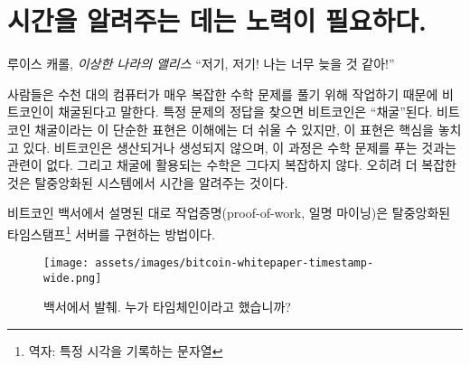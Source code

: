\chapter{시간을 알려주는 데는 노력이 필요하다.}
\label{les:17}

\begin{chapquote}{루이스 캐롤, \textit{이상한 나라의 앨리스}}
	\enquote{저기, 저기! 나는 너무 늦을 것 같아!}
\end{chapquote}

\begin{comment}
	It is often said that bitcoins are mined because thousands of computers
	work on solving \textit{very complex} mathematical problems. Certain problems
	are to be solved, and if you compute the right answer, you \enquote{produce} a
	bitcoin. While this simplified view of bitcoin mining might be easier to
	convey, it does miss the point somewhat. Bitcoins aren't produced or
	created, and the whole ordeal is not really about solving particular
	math problems. Also, the math isn't particularly complex. What is
	complex is \textit{telling the time} in a decentralized system.
\end{comment}
사람들은 수천 대의 컴퓨터가 매우 복잡한 수학 문제를 풀기 위해 작업하기 때문에 비트코인이 채굴된다고 말한다.
특정 문제의 정답을 찾으면 비트코인은 \enquote{채굴}된다.
비트코인 채굴이라는 이 단순한 표현은 이해에는 더 쉬울 수 있지만, 이 표현은 핵심을 놓치고 있다.
비트코인은 생산되거나 생성되지 않으며, 이 과정은 수학 문제를 푸는 것과는 관련이 없다.
그리고 채굴에 활용되는 수학은 그다지 복잡하지 않다. 
오히려 더 복잡한 것은 탈중앙화된 시스템에서 시간을 알려주는 것이다.

\begin{comment}
	As outlined in the whitepaper, the proof-of-work system (aka mining) is
	a way to implement a distributed timestamp server.
\end{comment}
비트코인 백서에서 설명된 대로 작업증명(proof-of-work, 일명 마이닝)은 탈중앙화된 타임스탬프\footnote{역자: 특정 시각을 기록하는 문자열} 서버를 구현하는 방법이다.

\begin{figure}
	\texttt{[image: assets/images/bitcoin-whitepaper-timestamp-wide.png]}
	\caption{백서에서 발췌. 누가 타임체인이라고 했습니까?}
	\label{fig:bitcoin-whitepaper-timestamp-wide}
\end{figure}

